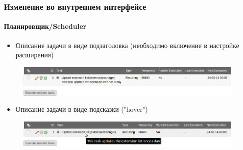 
\begin{frame}[fragile]
	\frametitle{Изменение во внутреннем интерфейсе}
	\framesubtitle{Планировщик/Scheduler}

	\begin{itemize}
		\item Описание задачи в виде подзаголовка\newline
			\small(необходимо включение в настройке расширения)\normalsize
	\end{itemize}

	\begin{figure}
		\includegraphics[width=0.95\linewidth]{Images/BackendChanges/SchedulerTaskDescriptionAsSubheader.png}
	\end{figure}


	\begin{itemize}
		\item Описание задачи в виде подсказки ("hover")
	\end{itemize}

	\begin{figure}
		\includegraphics[width=0.95\linewidth]{Images/BackendChanges/SchedulerTaskDescriptionAsTooltip.png}
	\end{figure}

\end{frame}



